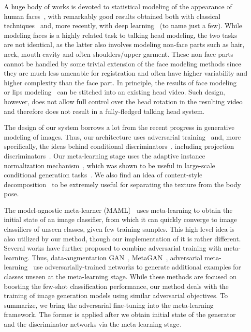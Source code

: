 \documentclass[10pt,twocolumn,letterpaper]{article}
\begin{document}
A huge body of works is devoted to statistical modeling of the appearance of human faces~\cite{Blanz99}, with remarkably good results obtained both with classical techniques~\cite{Thies16} and, more recently, with deep learning~\cite{Lombardi18, Nagano18} (to name just a few). While modeling faces is a highly related task to talking head modeling, the two tasks are not identical, as the latter also involves modeling non-face parts such as hair, neck, mouth cavity and often shoulders/upper garment. These non-face parts cannot be handled by some trivial extension of the face modeling methods since they are much less amenable for registration and often have higher variability and higher complexity than the face part. In principle, the results of face modeling~\cite{Thies16} or lips modeling~\cite{Suwajanakorn17} can be stitched into an existing head video. Such design, however, does not allow full control over the head rotation in the resulting video and therefore does not result in a fully-fledged talking head system.

The design of our system borrows a lot from the recent progress in generative modeling of images. Thus, our architecture uses adversarial training~\cite{Goodfellow14} and, more specifically, the ideas behind conditional discriminators~\cite{Mirza14}, including projection discriminators~\cite{Miyato18a}. Our meta-learning stage uses the adaptive instance normalization mechanism~\cite{Huang17}, which was shown to be useful in large-scale conditional generation tasks~\cite{Brock18,Karras18b}. We also find an idea of content-style decomposition~\cite{Huang18} to be extremely useful for separating the texture from the body pose.

The model-agnostic meta-learner (MAML)~\cite{Finn17} uses meta-learning to obtain the initial state of an image classifier, from which it can quickly converge to image classifiers of unseen classes, given few training samples. This high-level idea is also utilized by our method, though our implementation of it is rather different. Several works have further proposed to combine adversarial training with meta-learning. Thus, data-augmentation GAN~\cite{Antoniou18}, MetaGAN~\cite{Zhang18a}, adversarial meta-learning~\cite{Yin18} use adversarially-trained networks to generate additional examples for classes unseen at the meta-learning stage. While these methods are focused on boosting the few-shot classification performance, our method deals with the training of image generation models using similar adversarial objectives. To summarize, we bring the adversarial fine-tuning into the meta-learning framework. The former is applied after we obtain initial state of the generator and the discriminator networks via the meta-learning stage.
\end{document}
